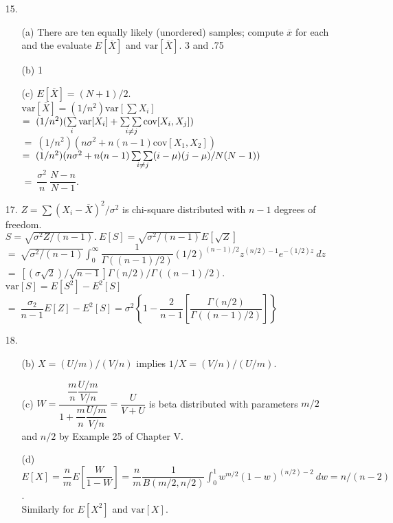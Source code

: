 \begin{enumerate}
	\item[15.]  \begin{enumerate}
		\item[(a)] There are ten equally likely (unordered) samples; compute $\overline{x}$ for each and the evaluate $E[\overline{X}]$ and $\mbox{var}[\overline{X}].$ 3 and .75
		\item[(b)] 1
		\item[(c)] $E[\overline{X}] = (N+1)/2$. \\
			$\mbox{var}[\overline{X}] = (1/n^2)\mbox{var}[\sum X_i]$ \\
			$=\ (1/n^2)(\sum\limits_i\mbox{var}[X_i] + \sum\sum\limits_{\hspace{-.15in}{i\ne j}}\mbox{cov}[X_i, X_j])$ \\
			$=\ (1/n^2)(n\sigma^2 + n(n-1)\mbox{cov}[X_1,X_2])$ \\
			$=\ (1/n^2)(n\sigma^2 + n(n-1)\sum\sum\limits_{\hspace{-.15in}{i\ne j}}(i-\mu)(j-\mu)/N(N-1))$ \\
			$=\ \dfrac{\sigma^2}{n}\ \dfrac{N-n}{N-1}$.
	\end{enumerate}

	\item[17.] $Z=\sum(X_i-\overline{X})^2/\sigma^2$ is chi-square distributed with $n-1$ degrees of freedom. \\
	$S = \sqrt{\sigma^2Z/(n-1)}.\ E[S] = \sqrt{\sigma^2/(n-1)}E[\sqrt{Z}]$ \\
	$=\ \sqrt{\sigma^2/(n-1)}\displaystyle\int_0^\infty \dfrac{1}{\Gamma((n-1)/2)}(1/2)^{(n-1)/2}z^{(n/2)-1}e^{-(1/2)z}\ dz$ \\
	$=\ [(\sigma\sqrt{2})/\sqrt{n-1}]\Gamma(n/2)/\Gamma((n-1)/2)$. \\
	$\mbox{var}[S]=E[S^2]-E^2[S]$ \\
	$=\ \dfrac{\sigma_2}{n-1}E[Z] - E^2[S] = \sigma^2\left\{1-\dfrac{2}{n-1}\left[\dfrac{\Gamma(n/2)}{\Gamma((n-1)/2)}\right]\right\}$

	\item[18.]  \begin{enumerate}
		\item[(b)] $X = (U/m)/(V/n)$ implies $1/X = (V/n)/(U/m)$.
		\item[(c)] $W = \dfrac{\dfrac{m}{n}\dfrac{U/m}{V/n}}{1+\dfrac{m}{n}\dfrac{U/m}{V/n}} = \dfrac{U}{V+U}$ is beta distributed with parameters $m/2$ and $n/2$ by Example 25 of Chapter V.
		\item[(d)] $E[X] = \dfrac{n}{m}E[\dfrac{W}{1-W}] = \dfrac{n}{m}\dfrac{1}{B(m/2,n/2)}\displaystyle \int_0^1 w^{m/2}(1-w)^{(n/2)-2}\ dw = n/(n-2)$. \\
		Similarly for $E[X^2]$ and $\mbox{var}[X]$.
	\end{enumerate}


\end{enumerate}
